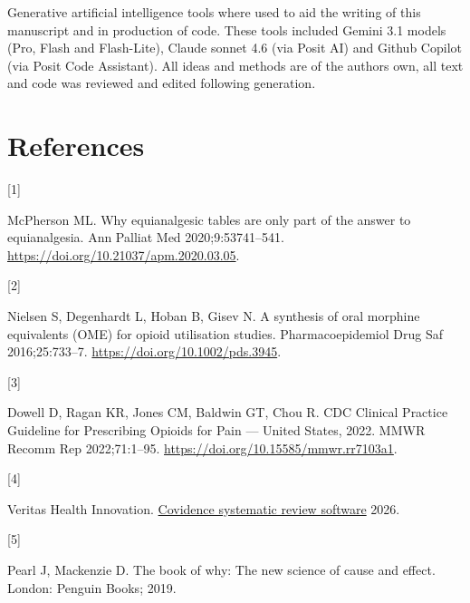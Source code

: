 \documentclass[
  letterpaper,
  DIV=11,
  numbers=noendperiod]{scrreprt}
\newlength{\cslhangindent}
\newlength{\csllabelwidth}
\newenvironment{CSLReferences}[2] %
 {\begin{list}{}{%
  \setlength{\itemindent}{0pt}
  \setlength{\leftmargin}{0pt}
  \setlength{\parsep}{0pt}
  \ifodd #1
   \setlength{\leftmargin}{\cslhangindent}
   \setlength{\itemindent}{-1\cslhangindent}
  \fi
  \setlength{\itemsep}{#2\baselineskip}}}
 {\end{list}}
\newcommand{\CSLLeftMargin}[1]{\parbox[t]{\csllabelwidth}{\strut#1\strut}}
\newcommand{\CSLRightInline}[1]{\parbox[t]{\linewidth - \csllabelwidth}{\strut#1\strut}}
\begin{document}
Generative artificial intelligence tools where used to aid the writing
of this manuscript and in production of code. These tools included
Gemini 3.1 models (Pro, Flash and Flash-Lite), Claude sonnet 4.6 (via
Posit AI) and Github Copilot (via Posit Code Assistant). All ideas and
methods are of the authors own, all text and code was reviewed and
edited following generation.


\chapter*{References}\label{references}


\label{refs}
\begin{CSLReferences}{0}{0}
\CSLLeftMargin{{[}1{]} }%
\CSLRightInline{McPherson ML. Why equianalgesic tables are only part of
the answer to equianalgesia. Ann Palliat Med 2020;9:53741--541.
\url{https://doi.org/10.21037/apm.2020.03.05}.}

\CSLLeftMargin{{[}2{]} }%
\CSLRightInline{Nielsen S, Degenhardt L, Hoban B, Gisev N. A synthesis
of oral morphine equivalents ({OME}) for opioid utilisation studies.
Pharmacoepidemiol Drug Saf 2016;25:733--7.
\url{https://doi.org/10.1002/pds.3945}.}

\CSLLeftMargin{{[}3{]} }%
\CSLRightInline{Dowell D, Ragan KR, Jones CM, Baldwin GT, Chou R. {CDC
Clinical Practice Guideline} for {Prescribing Opioids} for {Pain} ---
{United States}, 2022. MMWR Recomm Rep 2022;71:1--95.
\url{https://doi.org/10.15585/mmwr.rr7103a1}.}

\CSLLeftMargin{{[}4{]} }%
\CSLRightInline{Veritas Health Innovation.
\href{https://www.covidence.org}{Covidence systematic review software}
2026.}

\CSLLeftMargin{{[}5{]} }%
\CSLRightInline{Pearl J, Mackenzie D. The book of why: The new science
of cause and effect. London: Penguin Books; 2019.}

\end{CSLReferences}

\cleardoublepage
{}
{}
\appendix
\end{document}
